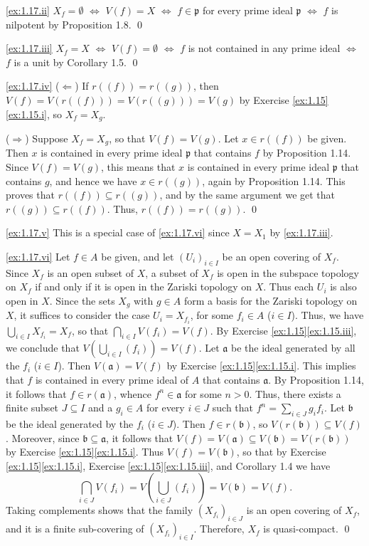 \noindent
\ref{ex:1.17.ii}
$X_f = \emptyset$ $\iff$ $V(f) = X$ $\iff$ $f\in\mathfrak p$ for every prime ideal $\mathfrak p$ $\iff$ $f$ is nilpotent by Proposition 1.8.
\qed

\noindent
\ref{ex:1.17.iii}
$X_f = X$ $\iff$ $V(f) = \emptyset$ $\iff$ $f$ is not contained in any prime ideal $\iff$ $f$ is a unit by Corollary 1.5.
\qed

\noindent
\ref{ex:1.17.iv}
($\Leftarrow$)
If $r((f)) = r((g))$, then $V(f) = V(r((f))) = V(r((g))) = V(g)$ by Exercise \ref{ex:1.15}\ref{ex:1.15.i}, so $X_f = X_g$.

($\Rightarrow$)
Suppose $X_f = X_g$, so that $V(f) = V(g)$.
Let $x \in r((f))$ be given.
Then $x$ is contained in every prime ideal $\mathfrak p$ that contains $f$ by Proposition 1.14.
Since $V(f) = V(g)$, this means that $x$ is contained in every prime ideal $\mathfrak p$ that contains $g$, and hence we have $x \in r((g))$, again by Proposition 1.14.
This proves that $r((f))\subseteq r((g))$, and by the same argument we get that $r((g)) \subseteq r((f))$.
Thus, $r((f)) = r((g))$.
\qed

\noindent
\ref{ex:1.17.v}
This is a special case of \ref{ex:1.17.vi} since $X = X_1$ by \ref{ex:1.17.iii}.

\noindent
\ref{ex:1.17.vi}
Let $f\in A$ be given, and let $(U_i)_{i\in I}$ be an open covering of $X_f$.
Since $X_f$ is an open subset of $X$, a subset of $X_f$ is open in the subspace topology on $X_f$ if and only if it is open in the Zariski topology on $X$.
Thus each $U_i$ is also open in $X$.
Since the sets $X_g$ with $g\in A$ form a basis for the Zariski topology on $X$, it suffices to consider the case $U_i = X_{f_i}$, for some $f_i \in A$ ($i \in I$).
Thus, we have $\bigcup_{i\in I} X_{f_i} = X_f$, so that $\bigcap_{i\in I} V(f_i) = V(f)$.
By Exercise \ref{ex:1.15}\ref{ex:1.15.iii}, we conclude that $V\left(\bigcup_{i\in I} (f_i)\right) = V(f)$.
Let $\mathfrak a$ be the ideal generated by all the $f_i$ ($i\in I$).
Then $V(\mathfrak a) = V(f)$ by Exercise \ref{ex:1.15}\ref{ex:1.15.i}.
This implies that $f$ is contained in every prime ideal of $A$ that contains $\mathfrak a$.
By Proposition 1.14, it follows that $f \in r(\mathfrak a)$, whence $f^n \in \mathfrak a$ for some $n > 0$.
Thus, there exists a finite subset $J \subseteq I$ and a $g_i \in A$ for every $i \in J$ such that $f^n = \sum_{i\in J} g_i f_i$.
Let $\mathfrak b$ be the ideal generated by the $f_i$ ($i\in J$).
Then $f \in r(\mathfrak b)$, so $V(r(\mathfrak b)) \subseteq V(f)$.
Moreover, since $\mathfrak b \subseteq \mathfrak a$, it follows that $V(f) = V(\mathfrak a) \subseteq V(\mathfrak b) = V(r(\mathfrak b))$ by Exercise \ref{ex:1.15}\ref{ex:1.15.i}.
Thus $V(f) = V(\mathfrak b)$, so that by Exercise \ref{ex:1.15}\ref{ex:1.15.i}, Exercise \ref{ex:1.15}\ref{ex:1.15.iii}, and Corollary 1.4 we have
\begin{equation*}
\bigcap_{i \in J} V(f_i)
= V\left(\bigcup_{i\in J} (f_i)\right)
= V(\mathfrak b)
= V(f).
\end{equation*}
Taking complements shows that the family $(X_{f_i})_{i\in J}$ is an open covering of $X_f$, and it is a finite sub-covering of $(X_{f_i})_{i\in I}$.
Therefore, $X_f$ is quasi-compact.
\qed

